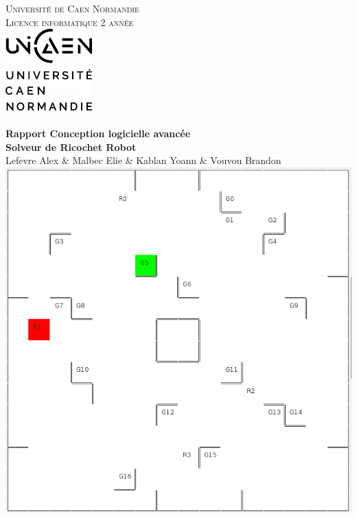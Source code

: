 \documentclass[a4paper]{article} %
\begin{document}
\makeatletter
  \begin{titlepage}
  \centering
      {\large \textsc{Université de Caen Normandie}}\\
      \textsc{Licence informatique 2 année}\\
    \vspace{1cm}
      \includegraphics[width=0.25\textwidth]{images/unicaen.jpg}\\
    \vspace{1cm}
      {\large\textbf{	\@date\\
       Rapport Conception logicielle avancée}}\\
    \vfill
       {\LARGE \textbf{
       Solveur de Ricochet Robot}}\\
    \vspace{2em}
        {\large Lefevre Alex \& Malbec Elie \& Kablan Yoann \& Vouvou Brandon} \\
    \vfill
       \includegraphics[height=0.4\textheight]{images/visuBoard.png}
     \vfill
  \end{titlepage}
\makeatother
\newpage
\tableofcontents
\newpage
\end{document}
